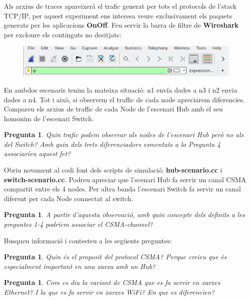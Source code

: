 \documentclass[12pt,a4paper]{article}
\newcounter{exercises}
\newtheorem{exer}[exercises]{Pregunta}
\begin{document}
\begin{enumerate}
Als arxius de traces apareixerà el trafic generat per tots el protocols de l'stack TCP/IP, per aquest experiment ens interesa veure exclusivament els paquets generats per les aplicacions \textbf{OnOff}. Feu servir la barra de filtre de \textbf{Wireshark} per excloure els continguts no desitjats:
\begin{figure}[!ht]
  \begin{center}
    \includegraphics[width=1\textwidth]{wireshark-filter}    
    \label{wireshark}
  \end{center}
\end{figure}

En ambdos escenaris tenim la mateixa situació: n1 envía dades a n3 i n2 envia dades a n4. Tot i això, si observem el traffic de cada node apreciarem diferencies. Compareu els arxius de traffic de cada Node de l'escenari Hub amb el seu homonim de l'escenari Switch.

\begin{exer} Quin trafic podem observar als nodes de l'escenari Hub però no als del Switch? Amb quin dels trets diferenciadors esmentats a la Pregunta 4 associaríeu aquest fet?\end{exer}

Obriu novament al codi font dels scripts de simulació: \textbf{hub-scenario.cc} i \textbf{switch-scenario.cc}. Podreu apreciar que
l'scenari Hub fa servir un canal CSMA compartit entre els 4 nodes. Per altra banda l'escenari Switch fa servir un canal diferent per cada Node connectat al switch.

\begin{exer} A partir d'aquesta observació, amb quin concepte dels definits a les preguntes 1-4 podriem associar el CSMA-channel? \end{exer}

Busqueu informació i contesteu a les següents preguntes:
\begin{exer} Quin és el proposit del protocol CSMA? Perque creieu que és especialment important en una xarxa amb un Hub?\end{exer}
\begin{exer} Com es diu la variant de CSMA que es fa servir en xarxes Ethernet? I la que es fa servir en xarxes WiFi? En que es diferencien? \end{exer}


\end{enumerate}
\end{document}
